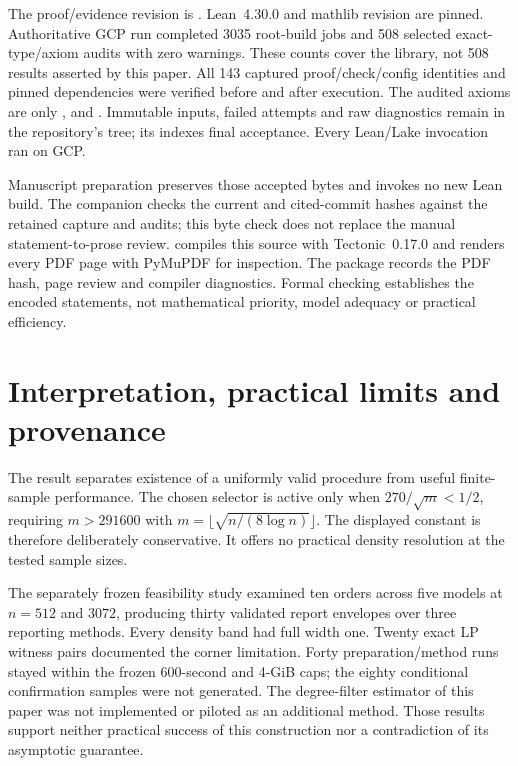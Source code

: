 \documentclass[11pt]{article}
\theoremstyle{remark}
\begin{document}
The proof/evidence revision is
\href{https://github.com/Quantyra/quantyra-null-cone-lean/tree/a0b1f6846d6f0b89a94704ed2954645bcac756fd}{}.
Lean~4.30.0 and mathlib revision
 are pinned.
Authoritative GCP run
completed 3035 root-build jobs and 508 selected exact-type/axiom
audits with zero warnings. These counts cover the library, not
508 results asserted by this paper. All 143 captured proof/check/config
identities and pinned dependencies were verified before and after
execution. The audited axioms are only ,
 and . Immutable inputs,
failed attempts and raw diagnostics remain in the repository's
 tree; its 
indexes final acceptance. Every Lean/Lake invocation ran on GCP.

Manuscript preparation preserves those accepted bytes and invokes no
new Lean build. The companion  checks the
current and cited-commit hashes against the retained capture and audits;
this byte check does not replace the manual statement-to-prose review.
 compiles this source with Tectonic~0.17.0 and renders
every PDF page with PyMuPDF for inspection. The package records the
PDF hash, page review and compiler diagnostics.
Formal checking establishes the encoded statements, not mathematical
priority, model adequacy or practical efficiency.

\section{Interpretation, practical limits and provenance}
\label{sec:limits}
The result separates existence of a uniformly valid procedure from
useful finite-sample performance. The chosen selector is active only
when $270/\sqrt m<1/2$, requiring $m>291600$ with
$m=\lfloor\sqrt{n/(8\log n)}\rfloor$. The displayed constant is
therefore deliberately conservative. It offers no practical density
resolution at the tested sample sizes.

The separately frozen feasibility study \cite{Study} examined ten
orders across five models at $n=512$ and $3072$, producing thirty
validated report envelopes over three reporting methods. Every density
band had full width one. Twenty exact LP witness pairs documented
the corner limitation. Forty preparation/method runs stayed within
the frozen 600-second and 4-GiB caps; the eighty conditional confirmation
samples were not generated. The degree-filter estimator of this paper
was not implemented or piloted as an additional method. Those results
support neither practical success of this construction nor a
contradiction of its asymptotic guarantee.
\end{document}
